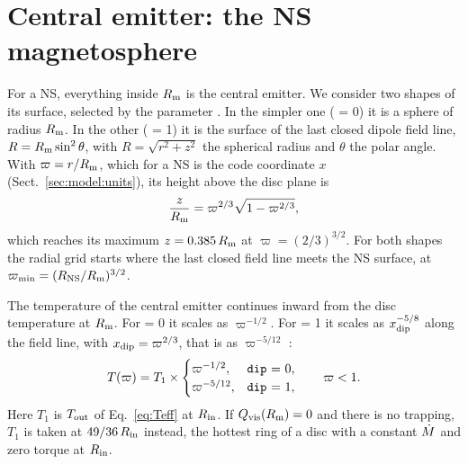 
\section{Central emitter: the NS magnetosphere}
\label{sec:central}

For a NS, everything inside $R_{\rm m}$ is the central emitter.
We consider two shapes of its surface, selected by the parameter .
In the simpler one ( = 0) it is a sphere of radius $R_{\rm m}$.
In the other ( = 1) it is the surface of the last closed dipole field line, $R = R_{\rm m}\sin^2\theta$, with $R = \sqrt{r^2 + z^2}$ the spherical radius and $\theta$ the polar angle.
With $\varpi = r/R_{\rm m}$, which for a NS is the code coordinate $x$ (Sect.~\ref{sec:model:units}), its height above the disc plane is
\begin{equation}
\frac{z}{R_{\rm m}} = \varpi^{2/3}\sqrt{1 - \varpi^{2/3}},
\label{eq:dipole}
\end{equation}
which reaches its maximum $z = 0.385\,R_{\rm m}$ at $\varpi = (2/3)^{3/2}$.
For both shapes the radial grid starts where the last closed field line meets the NS surface, at $\varpi_{\rm min} = (R_{\rm NS}/R_{\rm m})^{3/2}$.

The temperature of the central emitter continues inward from the disc temperature at $R_{\rm m}$.
For  = 0 it scales as $\varpi^{-1/2}$.
For  = 1 it scales as $x_{\rm dip}^{-5/8}$ along the field line, with $x_{\rm dip} = \varpi^{2/3}$, that is as $\varpi^{-5/12}$ \citep{LipunovaAbolmasov2027}:
\begin{equation}
T(\varpi) = T_1 \times
\begin{cases}
\varpi^{-1/2}, & \text{\texttt{dip} = 0}, \\
\varpi^{-5/12}, & \text{\texttt{dip} = 1},
\end{cases}
\qquad \varpi < 1 .
\label{eq:Tcentral}
\end{equation}
Here $T_1$ is $T_{\rm out}$ of Eq.~\eqref{eq:Teff} at $R_{\rm in}$.
If $Q_{\rm vis}(R_{\rm m}) = 0$ and there is no trapping, $T_1$ is taken at $49/36\,R_{\rm in}$ instead, the hottest ring of a disc with a constant $\dot M$ and zero torque at $R_{\rm in}$.

